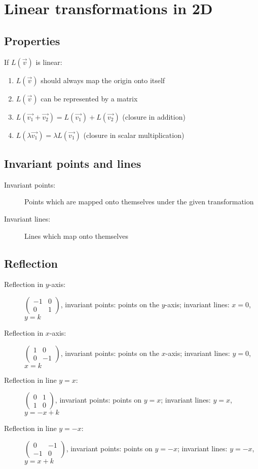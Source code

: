 \section{Linear transformations in 2D}
\subsection{Properties}
If $L(\vec{v})$ is linear:
\begin{enumerate}
    \item $L(\vec{v})$ should always map the origin onto itself
    \item $L(\vec{v})$ can be represented by a matrix
    \item $L(\vec{v_1}+\vec{v_2})=L(\vec{v_1})+L(\vec{v_2})$ (closure in addition)
    \item $L(\lambda\vec{v_1})=\lambda L(\vec{v_1})$ (closure in scalar multiplication)
\end{enumerate}
\subsection{Invariant points and lines}
\begin{description}
    \item[Invariant points:] Points which are mapped onto themselves under the given transformation
    \item[Invariant lines:] Lines which map onto themselves
\end{description}

\subsection{Reflection}
\begin{description}
    \item[Reflection in $y$-axis:] $\begin{pmatrix}
                  -1 & 0 \\0&1
              \end{pmatrix}$, invariant points: points on the $y$-axis; invariant lines: $x=0$, $y=k$
    \item[Reflection in $x$-axis:] $\begin{pmatrix}
                  1 & 0 \\0&-1
              \end{pmatrix}$, invariant points: points on the $x$-axis; invariant lines: $y=0$, $x=k$
    \item[Reflection in line $y=x$:] $\begin{pmatrix}
                  0 & 1 \\1&0
              \end{pmatrix}$, invariant points: points on $y=x$; invariant lines: $y=x$, $y=-x+k$
    \item[Reflection in line $y=-x$:] $\begin{pmatrix}
                  0 & -1 \\-1&0
              \end{pmatrix}$, invariant points: points on $y=-x$; invariant lines: $y=-x$, $y=x+k$
\end{description}

